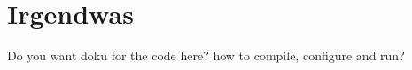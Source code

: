 \chapter{Irgendwas}
\label{sec:irgendwas}

Do you want doku for the code here? how to compile, configure and run?
